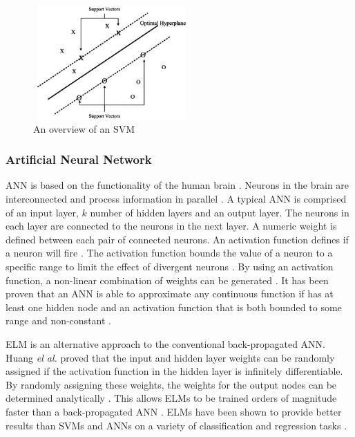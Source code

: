 \documentclass{sig-alternate-05-2015}
\begin{document}
	\begin{figure}
		\centering
		\includegraphics[height=4.34cm, width=6cm]{SVM}
		\caption{An overview  of an SVM \cite{Li2006772}}
		\label{fig:svm-overview}
	\end{figure}
	
	\subsubsection{Artificial Neural Network}
	ANN is based on the functionality of the human brain \cite{Wang2003}. Neurons in the brain are interconnected and process information in parallel \cite{Wang2003}. A typical ANN is comprised of an input layer, $k$ number of hidden layers and an output layer. The neurons in each layer are connected to the neurons in the next layer. A numeric weight is defined between each pair of connected neurons. An activation function defines if a neuron will fire \cite{Wang2003}. The activation function bounds the value of a neuron to a specific range to limit the effect of divergent neurons \cite{Wang2003}. By using an activation function, a non-linear combination of weights can be generated \cite{Wang2003}. It has been proven that an ANN is able to approximate any continuous function if has at least one hidden node and an activation function that is both bounded to some range and non-constant \cite{Hornik1991251}.
	
	ELM is an alternative approach to the conventional back-propagated ANN. Huang \textit{el al.} \cite{Huang2006489} proved that the input and hidden layer weights can be randomly assigned if the activation function in the hidden layer is infinitely differentiable. By randomly assigning these weights, the weights for the output nodes can be determined analytically \cite{Huang2006489}. This allows ELMs to be trained orders of magnitude faster than a back-propagated ANN \cite{6035797, Huang2006489}. ELMs have been shown to provide better results than SVMs and ANNs on a variety of classification and regression tasks \cite{6035797, Huang2006489}.
	
\end{document}
